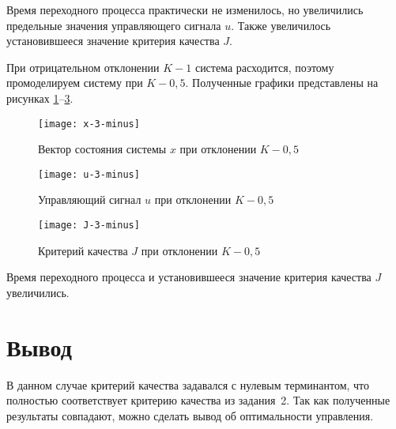 \documentclass[14pt, a4paper]{extarticle}
\begin{document}
	Время переходного процесса практически не изменилось, но увеличились предельные значения управляющего сигнала $u$. Также увеличилось установившееся значение критерия качества $J$.
	
	При отрицательном отклонении $K-1$ система расходится, поэтому промоделируем систему при $K-0,5$. Полученные графики представлены на рисунках \ref{fig:x-3-minus}--\ref{fig:J-3-minus}.
	
	\begin{figure}[H]
		\centering
		\texttt{[image: x-3-minus]}
		\caption{Вектор состояния системы $x$ при отклонении $K-0,5$}
		\label{fig:x-3-minus}
	\end{figure}
	
	\begin{figure}[H]
		\centering
		\texttt{[image: u-3-minus]}
		\caption{Управляющий сигнал $u$ при отклонении $K-0,5$}
		\label{fig:u-3-minus}
	\end{figure}
	
	\begin{figure}[H]
		\centering
		\texttt{[image: J-3-minus]}
		\caption{Критерий качества $J$ при отклонении $K-0,5$}
		\label{fig:J-3-minus}
	\end{figure}
	
	Время переходного процесса и установившееся значение критерия качества $J$ увеличились.
	
	\newpage
	
	\section*{Вывод}
	
	В данном случае критерий качества задавался с нулевым терминантом, что полностью соответствует критерию качества из задания~2. Так как полученные результаты совпадают, можно сделать вывод об оптимальности управления.
	
\end{document}
